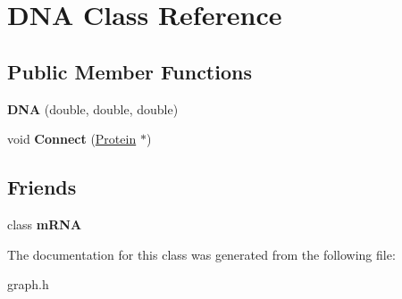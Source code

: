\hypertarget{class_d_n_a}{\section{D\-N\-A Class Reference}
\label{class_d_n_a}
}
\subsection*{Public Member Functions}
\begin{DoxyCompactItemize}
\item 
\hypertarget{class_d_n_a_a6d92499f10d383ac656e98694cc6c5e6}{{\bfseries D\-N\-A} (double, double, double)}\label{class_d_n_a_a6d92499f10d383ac656e98694cc6c5e6}

\item 
\hypertarget{class_d_n_a_a4db79a1d4530c15f30ec82cb8a502dda}{void {\bfseries Connect} (\hyperlink{class_protein}{Protein} $\ast$)}\label{class_d_n_a_a4db79a1d4530c15f30ec82cb8a502dda}

\end{DoxyCompactItemize}
\subsection*{Friends}
\begin{DoxyCompactItemize}
\item 
\hypertarget{class_d_n_a_a904bf77ec17baad950eb63ea5c40c6ea}{class {\bfseries m\-R\-N\-A}}\label{class_d_n_a_a904bf77ec17baad950eb63ea5c40c6ea}

\end{DoxyCompactItemize}


The documentation for this class was generated from the following file\-:\begin{DoxyCompactItemize}
\item 
graph.\-h\end{DoxyCompactItemize}
